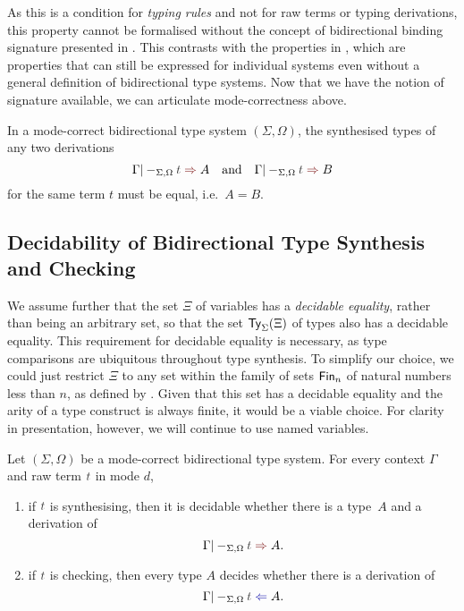 \begin{remark}
  As this is a condition for \emph{typing rules} and not for raw terms or typing derivations, this property cannot be formalised without the concept of bidirectional binding signature presented in .
  This contrasts with the properties in , which are properties that can still be expressed for individual systems even without a general definition of bidirectional type systems.
  Now that we have the notion of signature available, we can articulate mode-correctness above.
\end{remark}

\begin{lemma}\label{thm:unique-syn}
  In a mode-correct bidirectional type system $(\Sigma, \Omega)$, the synthesised types of any two derivations
  \[
    \Gamma |-_{\Sigma, \Omega} \isTerm{t} \syn A
    \quad\text{and}\quad
    \Gamma |-_{\Sigma, \Omega} \isTerm{t} \syn B
  \]
  for the same term $t$ must be equal, i.e.\ $A = B$.
\end{lemma}
 


\subsection{Decidability of Bidirectional Type Synthesis and Checking}\label{subsec:bidirectional-synthesis-checking}

We assume further that the set $\Xi$ of variables has a \emph{decidable equality}, rather than being an arbitrary set, so that the set $\mathsf{Ty}_{\Sigma}(\Xi)$ of types also has a decidable equality.
This requirement for decidable equality is necessary, as type comparisons are ubiquitous throughout type synthesis.
To simplify our choice, we could just restrict $\Xi$ to any set within the family of sets $\mathsf{Fin}_n$ of natural numbers less than $n$, as defined by \citet{Dybjer1994}.
Given that this set has a decidable equality and the arity of a type construct is always finite, it would be a viable choice.
For clarity in presentation, however, we will continue to use named variables.

\begin{theorem} \label{thm:bidirectional-type-synthesis-checking}
  Let $(\Sigma, \Omega)$ be a mode-correct bidirectional type system.
  For every context $\Gamma$ and raw term $\isTerm{t}$ in mode $d$, 
  \begin{enumerate}
    \item if $\isTerm{t}$ is synthesising, then it is decidable whether there is a type~$A$ and a derivation of
      \[
        \Gamma |-_{\Sigma, \Omega} \isTerm{t} \syn A.
      \]
    \item if $\isTerm{t}$ is checking, then every type $A$ decides whether there is a derivation of
      \[
        \Gamma |-_{\Sigma, \Omega} \isTerm{t} \chk A.
      \]
  \end{enumerate}
\end{theorem}

